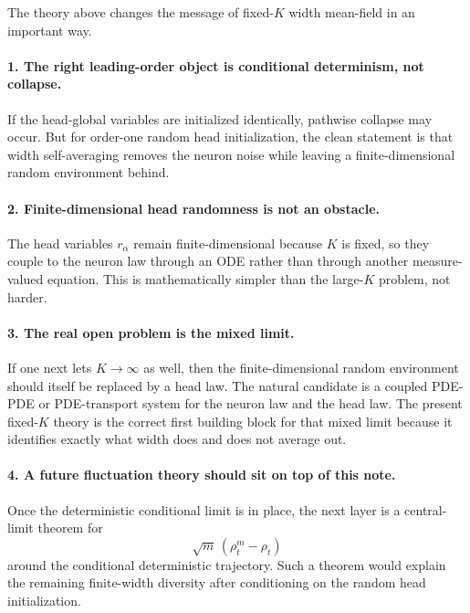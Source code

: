 \documentclass[11pt]{article}
\theoremstyle{definition}
\begin{document}
The theory above changes the message of fixed-$K$ width mean-field in an important way.

\paragraph{1. The right leading-order object is conditional determinism, not collapse.}
If the head-global variables are initialized identically, pathwise collapse may occur. But for order-one random head initialization, the clean statement is that width self-averaging removes the neuron noise while leaving a finite-dimensional random environment behind.

\paragraph{2. Finite-dimensional head randomness is not an obstacle.}
The head variables $r_\alpha$ remain finite-dimensional because $K$ is fixed, so they couple to the neuron law through an ODE rather than through another measure-valued equation. This is mathematically simpler than the large-$K$ problem, not harder.

\paragraph{3. The real open problem is the mixed limit.}
If one next lets $K\to\infty$ as well, then the finite-dimensional random environment should itself be replaced by a head law. The natural candidate is a coupled PDE-PDE or PDE-transport system for the neuron law and the head law. The present fixed-$K$ theory is the correct first building block for that mixed limit because it identifies exactly what width does and does not average out.

\paragraph{4. A future fluctuation theory should sit on top of this note.}
Once the deterministic conditional limit is in place, the next layer is a central-limit theorem for
\[
  \sqrt m\,(\rho_t^m-\rho_t)
\]
around the conditional deterministic trajectory. Such a theorem would explain the remaining finite-width diversity after conditioning on the random head initialization.
\end{document}
